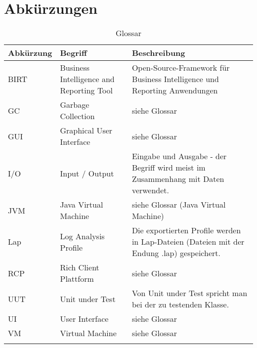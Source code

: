 \chapter*{Abkürzungen}\label{abkuerzungen}
  \begin{longtable}{|p{3cm}|p{5cm}|p{6.5cm}|}
\hline
  \textbf{Abkürzung} &\textbf{Begriff} &  \textbf{Beschreibung} \\\hline
BIRT & Business Intelligence and Reporting Tool & Open-Source-Framework für Business Intelligence und Reporting Anwendungen \\\hline
GC & Garbage Collection & siehe Glossar \\\hline
GUI & Graphical User Interface & siehe Glossar\\\hline
I/O & Input / Output & Eingabe und Ausgabe - der Begriff wird meist im Zusammenhang mit Daten verwendet.\\\hline
JVM & Java Virtual Machine & siehe Glossar (Java Virtual Machine)\\\hline
Lap & Log Analysis Profile & Die exportierten Profile werden in Lap-Dateien (Dateien mit der Endung .lap) gespeichert.\\\hline
RCP & Rich Client Plattform &siehe Glossar\\\hline
UUT & Unit under Test & Von Unit under Test spricht man bei der zu testenden Klasse.\\\hline
UI & User Interface & siehe Glossar \\\hline
VM & Virtual Machine &  siehe Glossar\\\hline
      \caption{Glossar}\\
  \end{longtable}



